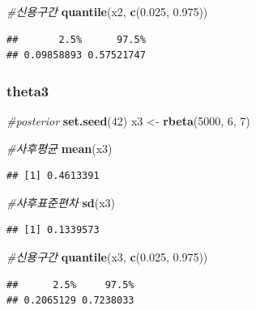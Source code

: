 \documentclass[
]{article}
\newenvironment{Shaded}{\begin{snugshade}}{\end{snugshade}}
\newcommand{\CommentTok}[1]{\textcolor[rgb]{0.56,0.35,0.01}{\textit{#1}}}
\newcommand{\DecValTok}[1]{\textcolor[rgb]{0.00,0.00,0.81}{#1}}
\newcommand{\FloatTok}[1]{\textcolor[rgb]{0.00,0.00,0.81}{#1}}
\newcommand{\FunctionTok}[1]{\textcolor[rgb]{0.13,0.29,0.53}{\textbf{#1}}}
\newcommand{\NormalTok}[1]{#1}
\newcommand{\OtherTok}[1]{\textcolor[rgb]{0.56,0.35,0.01}{#1}}
\begin{document}
\begin{Shaded}
\begin{Highlighting}[]
\CommentTok{\#신용구간}
\FunctionTok{quantile}\NormalTok{(x2, }\FunctionTok{c}\NormalTok{(}\FloatTok{0.025}\NormalTok{, }\FloatTok{0.975}\NormalTok{))}
\end{Highlighting}
\end{Shaded}

\begin{verbatim}
##       2.5%      97.5% 
## 0.09858893 0.57521747
\end{verbatim}

\subsubsection{theta3}\label{theta3}

\begin{Shaded}
\begin{Highlighting}[]
\CommentTok{\#posterior}
\FunctionTok{set.seed}\NormalTok{(}\DecValTok{42}\NormalTok{)}
\NormalTok{x3 }\OtherTok{\textless{}{-}} \FunctionTok{rbeta}\NormalTok{(}\DecValTok{5000}\NormalTok{, }\DecValTok{6}\NormalTok{, }\DecValTok{7}\NormalTok{)}

\CommentTok{\#사후평균}
\FunctionTok{mean}\NormalTok{(x3)}
\end{Highlighting}
\end{Shaded}

\begin{verbatim}
## [1] 0.4613391
\end{verbatim}

\begin{Shaded}
\begin{Highlighting}[]
\CommentTok{\#사후표준편차}
\FunctionTok{sd}\NormalTok{(x3)}
\end{Highlighting}
\end{Shaded}

\begin{verbatim}
## [1] 0.1339573
\end{verbatim}

\begin{Shaded}
\begin{Highlighting}[]
\CommentTok{\#신용구간}
\FunctionTok{quantile}\NormalTok{(x3, }\FunctionTok{c}\NormalTok{(}\FloatTok{0.025}\NormalTok{, }\FloatTok{0.975}\NormalTok{))}
\end{Highlighting}
\end{Shaded}

\begin{verbatim}
##      2.5%     97.5% 
## 0.2065129 0.7238033
\end{verbatim}
\end{document}
